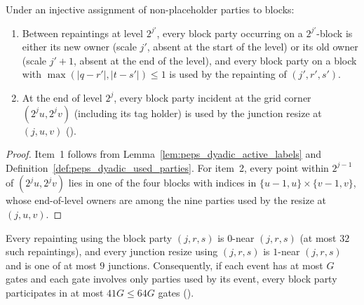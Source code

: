 \begin{lemma}
    \label{thm:peps_dyadic_active_label_parties}
    \leanok
    Under an injective assignment of non-placeholder parties to blocks:
    \begin{enumerate}
        \item Between repaintings at level $2^{j'}$, every block party occurring
              on a $2^{j'}$-block is either its new owner (scale $j'$, absent at
              the start of the level) or its old owner (scale $j'+1$, absent at
              the end of the level), and every block party on a block with
              $\max(|q-r'|,|t-s'|)\le1$ is used by the repainting of $(j',r',s')$.
        \item At the end of level $2^j$, every block party incident at the grid
              corner $(2^ju,2^jv)$ (including its tag holder) is used by the
              junction resize at $(j,u,v)$
              (\cite[Section~7, lines 585--609]{OpenAI2026PolynomialPEPS}).
    \end{enumerate}
\end{lemma}

\begin{proof}\leanok
    Item~1 follows from Lemma~\ref{lem:peps_dyadic_active_labels} and
    Definition~\ref{def:peps_dyadic_used_parties}. For item~2, every point within
    $2^{j-1}$ of $(2^ju,2^jv)$ lies in one of the four blocks with indices in
    $\{u-1,u\}\times\{v-1,v\}$, whose end-of-level owners are among the nine
    parties used by the resize at $(j,u,v)$.
\end{proof}

\begin{lemma}
    \label{thm:peps_dyadic_lifetime_parties}
    \leanok
    Every repainting using the block party $(j,r,s)$ is $0$-near $(j,r,s)$ (at
    most $32$ such repaintings), and every junction resize using $(j,r,s)$ is
    $1$-near $(j,r,s)$ and is one of at most $9$ junctions. Consequently, if each
    event has at most $G$ gates and each gate involves only parties used by its
    event, every block party participates in at most $41G\le64G$ gates
    (\cite[Proposition~7.1, item~2, lines 597--618]{OpenAI2026PolynomialPEPS}).
\end{lemma}

